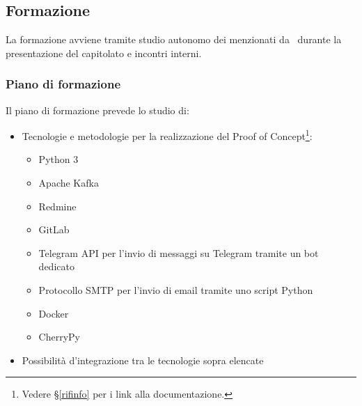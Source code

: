 	

	\subsection{Formazione}\label{Formazione}

		La formazione avviene tramite studio autonomo dei  menzionati da \II\ durante la presentazione del capitolato e incontri interni.

		\subsubsection{Piano di formazione}
		Il piano di formazione prevede lo studio di:
		\begin{itemize}
			\item Tecnologie e metodologie per la realizzazione del Proof of Concept\footnote{Vedere \S\ref{rifinfo} per i link alla documentazione.}:
			\begin{itemize}
				\item Python 3
				\item Apache Kafka
				\item Redmine
				\item GitLab
				\item Telegram API per l'invio di messaggi su Telegram tramite un bot dedicato
				\item Protocollo SMTP per l'invio di email tramite uno script Python
				\item Docker
				\item CherryPy
			\end{itemize}
			\item Possibilità d'integrazione tra le tecnologie sopra elencate
		\end{itemize}
